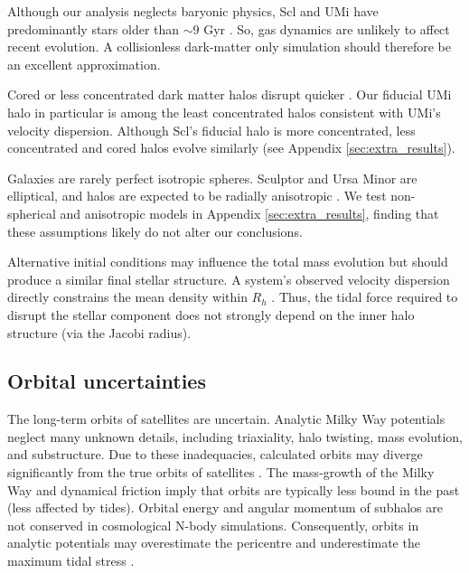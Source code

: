 Although our analysis neglects baryonic physics, Scl and UMi have
predominantly stars older than \(\sim 9\) Gyr
\citep{carrera+2002, deboer+2011, weisz+2014, delosreyes+2022, sato+2025}.
So, gas dynamics are unlikely to affect recent evolution. A
collisionless dark-matter only simulation should therefore be an
excellent approximation.

Cored or less concentrated dark matter halos disrupt quicker
\citep[e.g.,][]{stucker+2023}. Our fiducial UMi halo in particular is
among the least concentrated halos consistent with UMi's velocity
dispersion. Although Scl's fiducial halo is more concentrated, less
concentrated and cored halos evolve similarly (see Appendix
\ref{sec:extra_results}).

Galaxies are rarely perfect isotropic spheres. Sculptor and Ursa Minor
are elliptical, and halos are expected to be radially anisotropic
\citep[e.g.,][]{navarro+2010}. We test non-spherical and anisotropic
models in Appendix \ref{sec:extra_results}, finding that these
assumptions likely do not alter our conclusions.

Alternative initial conditions may influence the total mass evolution
but should produce a similar final stellar structure. A system's
observed velocity dispersion directly constrains the mean density within
\(R_h\) \citep[e.g.,][]{wolf+2010}. Thus, the tidal force required to
disrupt the stellar component does not strongly depend on the inner halo
structure (via the Jacobi radius).

\subsection{Orbital uncertainties}\label{orbital-uncertainties}

The long-term orbits of satellites are uncertain. Analytic Milky Way
potentials neglect many unknown details, including triaxiality, halo
twisting, mass evolution, and substructure. Due to these inadequacies,
calculated orbits may diverge significantly from the true orbits of
satellites \citep[e.g.,][]{dsouza+bell2022}. The mass-growth of the
Milky Way and dynamical friction imply that orbits are typically less
bound in the past (less affected by tides). Orbital energy and angular
momentum of subhalos are not conserved in cosmological N-body
simulations. Consequently, orbits in analytic potentials may
overestimate the pericentre and underestimate the maximum tidal stress
\citep[although typically not by enough to change our
conclusions,][]{santistevan+2023, santistevan+2024}.

